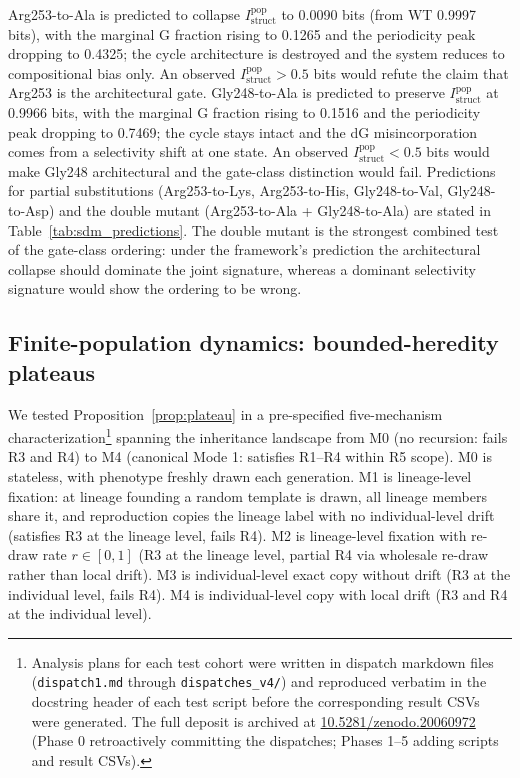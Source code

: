 \documentclass[aps,prx,reprint,amsmath,amssymb,floatfix,superscriptaddress,nofootinbib]{revtex4-2}
\newcommand{\zenodoDOI}{\href{https://doi.org/10.5281/zenodo.20060972}{10.5281/zenodo.20060972}}
\theoremstyle{plain-thm}
\theoremstyle{definition-thm}
\newcommand{\Istructpop}{I_{\mathrm{struct}}^{\mathrm{pop}}}
\begin{document}
Arg253-to-Ala is predicted to collapse $\Istructpop$ to 0.0090 bits (from WT 0.9997 bits), with the marginal G fraction rising to 0.1265 and the periodicity peak dropping to 0.4325; the cycle architecture is destroyed and the system reduces to compositional bias only. An observed $\Istructpop > 0.5$ bits would refute the claim that Arg253 is the architectural gate. Gly248-to-Ala is predicted to preserve $\Istructpop$ at 0.9966 bits, with the marginal G fraction rising to 0.1516 and the periodicity peak dropping to 0.7469; the cycle stays intact and the dG misincorporation comes from a selectivity shift at one state. An observed $\Istructpop < 0.5$ bits would make Gly248 architectural and the gate-class distinction would fail. Predictions for partial substitutions (Arg253-to-Lys, Arg253-to-His, Gly248-to-Val, Gly248-to-Asp) and the double mutant (Arg253-to-Ala + Gly248-to-Ala) are stated in Table~\ref{tab:sdm_predictions}. The double mutant is the strongest combined test of the gate-class ordering: under the framework's prediction the architectural collapse should dominate the joint signature, whereas a dominant selectivity signature would show the ordering to be wrong.


\subsection{Finite-population dynamics: bounded-heredity plateaus}
\label{sec:plateau}

We tested Proposition~\ref{prop:plateau} in a pre-specified five-mechanism characterization\footnote{Analysis plans for each test cohort were written in dispatch markdown files (\texttt{dispatch1.md} through \texttt{dispatches\_v4/}) and reproduced verbatim in the docstring header of each test script before the corresponding result CSVs were generated. The full deposit is archived at \zenodoDOI{} (Phase 0 retroactively committing the dispatches; Phases 1--5 adding scripts and result CSVs).} spanning the inheritance landscape from M0 (no recursion: fails R3 and R4) to M4 (canonical Mode 1: satisfies R1--R4 within R5 scope). M0 is stateless, with phenotype freshly drawn each generation. M1 is lineage-level fixation: at lineage founding a random template is drawn, all lineage members share it, and reproduction copies the lineage label with no individual-level drift (satisfies R3 at the lineage level, fails R4). M2 is lineage-level fixation with re-draw rate $r \in [0, 1]$ (R3 at the lineage level, partial R4 via wholesale re-draw rather than local drift). M3 is individual-level exact copy without drift (R3 at the individual level, fails R4). M4 is individual-level copy with local drift (R3 and R4 at the individual level).
\end{document}
